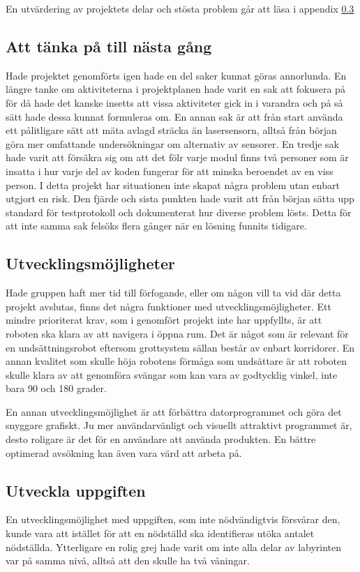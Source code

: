 \documentclass[11pt]{article}
\begin{document}
\begin{flushleft}
En utvärdering av projektets delar och stösta problem går att läsa i appendix \ref{}

\subsection{Att tänka på till nästa gång}

Hade projektet genomförts igen hade en del saker kunnat göras annorlunda. En längre tanke om aktiviteterna i projektplanen hade varit en sak att fokusera på för då hade det kanske insetts att vissa aktiviteter gick in i varandra och på så sätt hade dessa kunnat formuleras om. En annan sak är att från start använda ett pålitligare sätt att mäta avlagd sträcka än lasersensorn, alltså från början göra mer omfattande undersökningar om alternativ av sensorer. En tredje sak hade varit att försäkra sig om att det fölr varje modul finns två personer som är insatta i hur varje del av koden fungerar för att minska beroendet av en viss person. I detta projekt har situationen inte skapat några problem utan enbart utgjort en risk. Den fjärde och sista punkten hade varit att från början sätta upp standard för testprotokoll och dokumenterat hur diverse problem lösts. Detta för att inte samma sak felsöks flera gånger när en lösning funnits tidigare. 

\subsection{Utvecklingsmöjligheter}
Hade gruppen haft mer tid till förfogande, eller om någon vill ta vid där detta projekt avslutas, finns det några funktioner med utvecklingsmöjligheter. Ett mindre prioriterat krav, som i genomfört projekt inte har uppfyllts, är att roboten ska klara av att navigera i öppna rum. Det är något som är relevant för en undsättningsrobot eftersom grottsystem sällan består av enbart korridorer. En annan kvalitet som skulle höja robotens förmåga som undsättare är att roboten skulle klara av att genomföra svängar som kan vara av godtycklig vinkel, inte bara 90 och 180 grader. 

En annan utvecklingsmöjlighet är att förbättra datorprogrammet och göra det snyggare grafiskt. Ju mer användarvänligt och visuellt attraktivt programmet är, desto roligare är det för en användare att använda produkten. En bättre optimerad avsökning kan även vara värd att arbeta på.

\subsection{Utveckla uppgiften}
En utvecklingsmöjlighet med uppgiften, som inte nödvändigtvis försvårar den, kunde vara att istället för att en nödställd ska identifieras utöka antalet nödställda. Ytterligare en rolig grej hade varit om inte alla delar av labyrinten var på samma nivå, alltså att den skulle ha två våningar. 


\end{flushleft}
\end{document}
